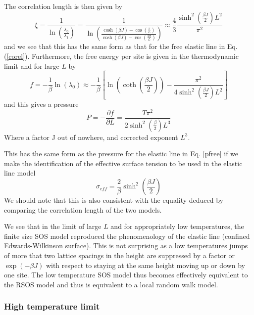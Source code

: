 The correlation length is then given by
\begin{equation}
\xi =\frac{1}{\ln(\frac{\lambda_0}{\lambda_1})} = \frac{1}{\ln(\frac{\cosh(\beta J) - \cos(\frac{\pi}{L})}{\cosh(\beta J) - \cos(\frac{2\pi}{L})})}\approx \frac{4}{3}\frac{\sinh^2(\frac{\beta J}{2})L^2}{\pi^2}
\end{equation}
and we see that this has the same form as that for the free elastic line in Eq. (\ref{corel}).
Furthermore, the free energy per site is given in the thermodynamic limit and for large $L$ by
\begin{equation}
f=-\frac{1}{\beta}\ln(\lambda_0) \approx -\frac{1}{\beta}\left[ \ln(\coth(\frac{\beta J}{2}))- \frac{\pi^2}{4\sinh^2(\frac{\beta J}{2}) L^2}\right]
\end{equation}
and this gives a pressure
\begin{equation}
P= -\frac{\partial f}{\partial L}= \frac{T\pi^2}{2 \sinh^2(\frac{\beta}{2}) L^3}
\end{equation}
{\color{red} Where a factor J out of nowhere, and corrected exponent $L^3$.}

This has the same form as the pressure for the elastic line in Eq. \eqref{pfree} if we make the identification of the effective surface tension to be used in the elastic line model
\begin{equation}
\sigma_{eff} = \frac{2}{\beta}\sinh^2(\frac{\beta J}{2})
\end{equation}
We should note that this is also consistent with the equality deduced by comparing the correlation length of the two models.

We see that in the limit of large $L$ and for appropriately low temperatures, the finite size SOS model reproduced the phenomenology of the elastic line (confined Edwards-Wilkinson surface). 
This is not surprising as a low temperatures jumps of more that two lattice spacings in the height are suppressed by a factor or $\exp(-\beta J)$ with respect to staying at the same height moving up or down by one site. The low temperature SOS model thus becomes effectively equivalent to the RSOS model and thus is equivalent to a local random walk model. 

\subsubsection*{High temperature limit}

